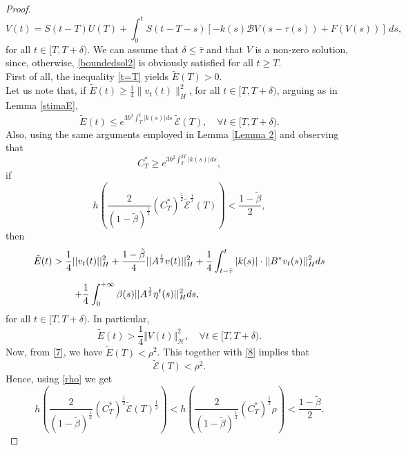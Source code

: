 \documentclass[11pt]{article}
\renewcommand{\geq}{\geqslant}
\renewcommand{\ge}{\geqslant}
\renewcommand{\leq}{\leqslant}
\begin{document}
\begin{proof}
\begin{equation}
	V(t)=S(t-T)U(T)+\int_{0}^{t}S(t-T-s)[-k(s)\mathcal{B}V(s-\tau(s))+F(V(s))]\, ds,
\end{equation} 
for all $t\in [T,T+\delta)$. We can assume that $\delta\leq \bar{\tau}$ and that $V$ is a non-zero solution, since, otherwise, \eqref{boundedsol2} is obviously satisfied for all $t\geq T$.
\\First of all, the inequality \eqref{t=T} yields $\tilde{E}(T)>0$.
\\Let us note that, if $\tilde{E}(t)\geq \frac{1}{4}\lVert v_t(t)\rVert^2_{H}$, for all $t\in [T,T+\delta)$, arguing as in Lemma \ref{stimaE},
\begin{equation}\label{stimaEmodificata}
	\tilde{E}(t)\leq e^{3b^2\int_{T}^{t}\lvert k(s)\rvert ds}\,\tilde{\mathcal{E}}(T),\quad \forall t\in [T,T+\delta).
\end{equation}
Also, using the same arguments employed in Lemma \ref{Lemma 2} and observing that
$$C^*_T\ge e^{3b^2\int_T^{2T}\vert k(s)\vert ds },$$ 
if
\begin{equation}\label{h3}
	h\left(\frac{2}{(1-\tilde{\beta})^{\frac{1}{2}}}(C^*_T)^{\frac{1}{2}}\tilde{\mathcal{E}}^{\frac{1}{2}}(T)\right)<\frac{1-\tilde{\beta}}{2},
\end{equation}
 then 
\begin{equation}\label{stima E dal bassomodificata}
	\begin{array}{l}
		\vspace{0.3cm}\displaystyle{ \tilde{E}(t)>\frac{1}{4}||v_t(t)||_H^2+\frac{1-\tilde{\beta}}{4}||A^\frac{1}{2}v(t)||_H^2+\frac{1}{4}\int_{t-\bar\tau}^t |k(s)| \cdot ||B^*v_t(s)||_H^2 ds}\\
		\hspace{1.5 cm}
		\displaystyle{ +\frac{1}{4}\int_0^{+\infty} \beta(s) ||A^\frac{1}{2}\eta^t (s)||_H^2 ds,}
	\end{array}
\end{equation}
for all $t\in[T,T+ \delta)$. In particular,
\begin{equation}\label{J2modificata}
\tilde{E}(t)> \frac 14 \Vert V(t)\Vert_{\mathcal H}^2, \quad \forall t\in [T, T+\delta).
\end{equation}
Now, from \eqref{7}, we have $\tilde{E}(T)<\rho^2$. This together with \eqref{8} implies that
\begin{equation}\label{E<rho}
	\tilde{\mathcal{E}}(T)<\rho^2.
\end{equation}
Hence, using \eqref{rho} we get
 \begin{equation}\label{9}
	h\left(\frac{2}{(1-\tilde{\beta})^{\frac{1}{2}}}(C^*_T)^{\frac{1}{2}}\tilde{\mathcal{E}}(T)^{\frac{1}{2}}\right)<h\left(\frac{2}{(1-\tilde{\beta})^{\frac{1}{2}}}(C^*_T)^{\frac{1}{2}}\rho\right)<\frac{1-\tilde{\beta}}{2}.

\end{equation}
\end{proof}
\end{document}
